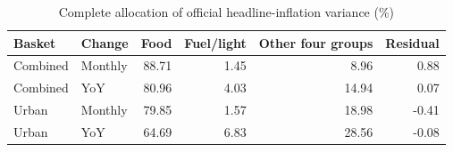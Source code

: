 \begin{table}[H]
\centering\small
\caption{Complete allocation of official headline-inflation variance (\%)}
\label{tab:variance}
\begin{tabular}{llrrrr}
\toprule
Basket & Change & Food & Fuel/light & Other four groups & Residual\\
\midrule
Combined & Monthly & 88.71 & 1.45 & 8.96 & 0.88\\
Combined & YoY & 80.96 & 4.03 & 14.94 & 0.07\\
Urban & Monthly & 79.85 & 1.57 & 18.98 & -0.41\\
Urban & YoY & 64.69 & 6.83 & 28.56 & -0.08\\
\bottomrule
\end{tabular}
\end{table}

